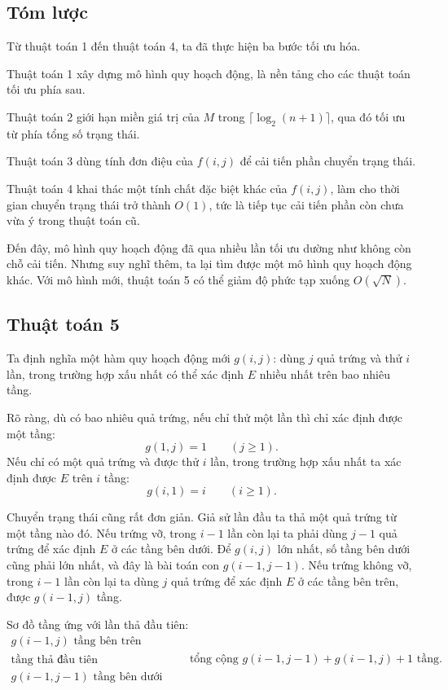 \documentclass[11pt]{article}
\begin{document}
\subsection{Tóm lược}

Từ thuật toán 1 đến thuật toán 4, ta đã thực hiện ba bước tối ưu hóa.

Thuật toán 1 xây dựng mô hình quy hoạch động, là nền tảng cho các thuật toán
tối ưu phía sau.

Thuật toán 2 giới hạn miền giá trị của $M$ trong
$\lceil\log_2(n+1)\rceil$, qua đó tối ưu từ phía tổng số trạng thái.

Thuật toán 3 dùng tính đơn điệu của $f(i,j)$ để cải tiến phần chuyển trạng
thái.

Thuật toán 4 khai thác một tính chất đặc biệt khác của $f(i,j)$, làm cho thời
gian chuyển trạng thái trở thành $O(1)$, tức là tiếp tục cải tiến phần còn
chưa vừa ý trong thuật toán cũ.

Đến đây, mô hình quy hoạch động đã qua nhiều lần tối ưu dường như không còn
chỗ cải tiến. Nhưng suy nghĩ thêm, ta lại tìm được một mô hình quy hoạch động
khác. Với mô hình mới, thuật toán 5 có thể giảm độ phức tạp xuống
$O(\sqrt{N})$.

\subsection{Thuật toán 5}

Ta định nghĩa một hàm quy hoạch động mới $g(i,j)$: dùng $j$ quả trứng và thử
$i$ lần, trong trường hợp xấu nhất có thể xác định $E$ nhiều nhất trên bao
nhiêu tầng.

Rõ ràng, dù có bao nhiêu quả trứng, nếu chỉ thử một lần thì chỉ xác định được
một tầng:
\[
  g(1,j)=1 \qquad (j\ge 1).
\]
Nếu chỉ có một quả trứng và được thử $i$ lần, trong trường hợp xấu nhất ta xác
định được $E$ trên $i$ tầng:
\[
  g(i,1)=i \qquad (i\ge 1).
\]

Chuyển trạng thái cũng rất đơn giản. Giả sử lần đầu ta thả một quả trứng từ
một tầng nào đó. Nếu trứng vỡ, trong $i-1$ lần còn lại ta phải dùng $j-1$ quả
trứng để xác định $E$ ở các tầng bên dưới. Để $g(i,j)$ lớn nhất, số tầng bên
dưới cũng phải lớn nhất, và đây là bài toán con $g(i-1,j-1)$. Nếu trứng không
vỡ, trong $i-1$ lần còn lại ta dùng $j$ quả trứng để xác định $E$ ở các tầng
bên trên, được $g(i-1,j)$ tầng.

Sơ đồ tầng ứng với lần thả đầu tiên:
\[
\begin{array}{c}
\text{$g(i-1,j)$ tầng bên trên}\\
\hline
\text{tầng thả đầu tiên}\\
\hline
\text{$g(i-1,j-1)$ tầng bên dưới}
\end{array}
\qquad
\text{tổng cộng }g(i-1,j-1)+g(i-1,j)+1\text{ tầng.}
\]
\end{document}
